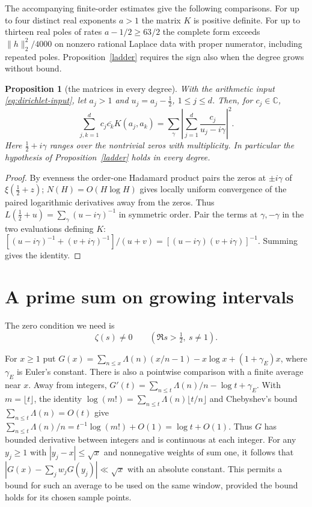 \documentclass[10pt]{amsart}
\newtheorem{proposition}[theorem]{Proposition}
\theoremstyle{definition}
\theoremstyle{remark}
\begin{document}
The accompanying finite-order estimates give the following comparisons. For up to four distinct real exponents $a>1$ the matrix $K$ is positive
definite. For up to thirteen real poles of rates
$a-1/2\ge63/2$ the complete form exceeds $\|h\|_2^2/4000$ on nonzero
rational Laplace data with proper numerator, including repeated poles. Proposition~\ref{ladder} requires the sign also
when the degree grows without bound.

\begin{proposition}[the matrices in every degree]\label{prop:all-degree-gram}
With the arithmetic input \eqref{eq:dirichlet-input}, let $a_j>1$
and $u_j=a_j-\tfrac12$, $1\le j\le d$. Then, for $c_j\in\mathbb C$,
\[
 \sum_{j,k=1}^d c_j\overline{c_k}K(a_j,a_k)
 =\sum_{\gamma}\left|\sum_{j=1}^d\frac{c_j}{u_j-i\gamma}\right|^2 .
\]
Here $\tfrac12+i\gamma$ ranges over the nontrivial zeros with multiplicity.
In particular the hypothesis of Proposition~\ref{ladder} holds in every degree.
\end{proposition}
\begin{proof}
By evenness the order-one Hadamard product pairs the zeros at $\pm i\gamma$
of $\xi(\tfrac12+z)$; $N(H)=O(H\log H)$ gives locally uniform convergence
of the paired logarithmic derivatives away from the zeros. Thus
$L(\tfrac12+u)=\sum_\gamma(u-i\gamma)^{-1}$ in symmetric order.
Pair the terms at $\gamma,-\gamma$ in the two evaluations defining $K$:
$[(u-i\gamma)^{-1}+(v+i\gamma)^{-1}]/(u+v)
=[(u-i\gamma)(v+i\gamma)]^{-1}$. Summing gives the identity.
\end{proof}

\section{A prime sum on growing intervals}\label{sec:primesum}
\setlength{\abovedisplayskip}{1.8pt plus 2pt minus 1pt}
\setlength{\belowdisplayskip}{1.8pt plus 2pt minus 1pt}
The zero condition we need is
\begin{equation}\label{eq:dirichlet-input}
 \zeta(s)\ne0\qquad (\Re s>\tfrac12,\ s\ne1).
\end{equation}

For $x\ge1$ put $G(x)=\sum_{n\le x}\Lambda(n)(x/n-1)-x\log x+
(1+\gamma_E)x$, where $\gamma_E$ is Euler's constant.
There is also a pointwise comparison with a finite average near $x$.
Away from integers,
$G'(t)=\sum_{n\le t}\Lambda(n)/n-\log t+\gamma_E$.
With $m=\lfloor t\rfloor$, the identity
$\log(m!)=\sum_{n\le t}\Lambda(n)\lfloor t/n\rfloor$ and
Chebyshev's bound $\sum_{n\le t}\Lambda(n)=O(t)$ give
$\sum_{n\le t}\Lambda(n)/n=t^{-1}\log(m!)+O(1)=\log t+O(1)$.
Thus $G$ has bounded derivative between integers and is continuous
at each integer. For any $y_j\ge1$ with $|y_j-x|\le\sqrt{x}$ and
nonnegative weights of sum one, it follows that
$|G(x)-\sum_j w_jG(y_j)|\ll\sqrt{x}$ with an absolute constant.
This permits a bound for such an average to be used on the same
window, provided the bound holds for its chosen sample points.
\end{document}
